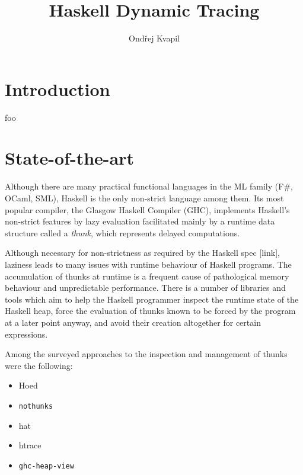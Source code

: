 \documentclass[thesis=B,english]{FITthesis}[2019/12/23]
\title{Haskell Dynamic Tracing}
\author{Ondřej Kvapil} %
\begin{document}

\chapter{Introduction}
foo


\chapter{State-of-the-art}
Although there are many practical functional languages in the ML family (F\#,
OCaml, SML), Haskell is the only non-strict language among them. Its most
popular compiler, the Glasgow Haskell Compiler (GHC), implements Haskell's
non-strict features by lazy evaluation facilitated mainly by a runtime data
structure called a \textit{thunk}, which represents delayed computations.

Although necessary for non-strictness as required by the Haskell spec [link],
laziness leads to many issues with runtime behaviour of Haskell programs.  The
accumulation of thunks at runtime is a frequent cause of pathological memory
behaviour and unpredictable performance. There is a number of libraries and
tools which aim to help the Haskell programmer inspect the runtime state of the
Haskell heap, force the evaluation of thunks known to be forced by the program
at a later point anyway, and avoid their creation altogether for certain
expressions.

Among the surveyed approaches to the inspection and management of thunks were
the following:
\begin{itemize}
	\item Hoed
	\item \texttt{nothunks}
	\item hat
	\item htrace
	\item \texttt{ghc-heap-view}
\end{itemize}

\end{document}
